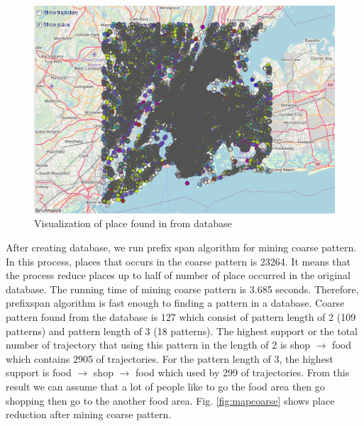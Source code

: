 \documentclass[conference]{IEEEtran}
\begin{document}
\begin{figure}[h!]
	\centering
	\includegraphics[width=1\linewidth]{mapDatabase}
	\caption{Visualization of place found in from database}
	\label{fig:mapdatabase}
\end{figure}

After creating database, we run prefix span algorithm for mining coarse pattern. In this process, places that occurs in the coarse pattern is 23264. It means that the process reduce places up to half of number of place occurred in the original database. The running time of mining coarse pattern is 3.685 seconds. Therefore, prefixspan algorithm is fast enough to finding a pattern in a database. Coarse pattern found from the database is 127 which consist of pattern length of 2 (109 patterns) and pattern length of 3 (18 patterns). The highest support or the total number of trajectory that using this pattern in the length of 2 is shop $\rightarrow$ food which contains 2905 of trajectories. For the pattern length of 3, the highest support is food $\rightarrow$ shop $\rightarrow$ food which used by 299 of trajectories. From this result we can assume that a lot of people like to go the food area then go shopping then go to the another food area. Fig. \ref{fig:mapcoarse} shows place reduction after mining coarse pattern.
\end{document}

